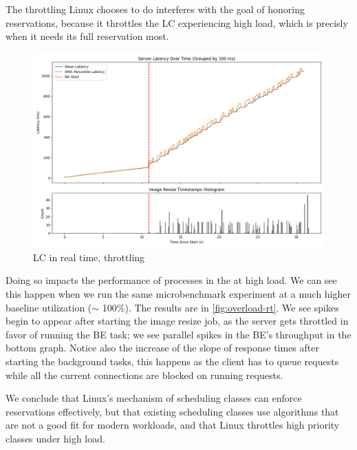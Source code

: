 The throttling Linux chooses to do interferes with the goal of honoring
reservations, because it throttles the LC experiencing high load, which is
precisly when it needs its full reservation  most.


\begin{figure}[t]
    \centering
    \includegraphics[width=\columnwidth]{graphs/overload-rt.png}
    \caption{LC in real time, throttling}\label{fig:overload-rt}
\end{figure}



Doing so impacts the performance of processes in the \rtclass{} at high load. We
can see this happen when we run the same microbenchmark experiment at a much
higher baseline utilization ($\sim$ 100\%). The results are in
\autoref{fig:overload-rt}. We see spikes begin to appear after starting the
image resize job, as the \rtclass{} server gets throttled in favor of running
the BE task; we see parallel spikes in the BE's throughput in the bottom graph.
Notice also the increase of the slope of response times after starting the
background tasks, this happens as the client has to queue requests while all the
current connections are blocked on running requests.

We conclude that Linux's mechanism of scheduling classes can enforce
reservations effectively, but that existing scheduling classes use algorithms
that are not a good fit for modern workloads, and that Linux throttles high
priority classes under high load.

